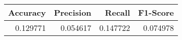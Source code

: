 \begin{tabular}{rrrr}
\toprule
 Accuracy &  Precision &   Recall &  F1-Score \\
\midrule
 0.129771 &   0.054617 & 0.147722 &  0.074978 \\
\bottomrule
\end{tabular}
